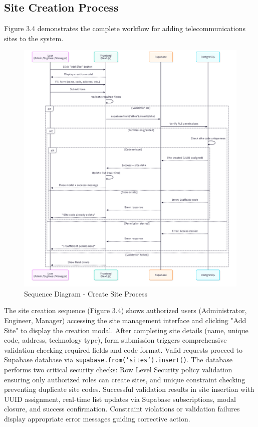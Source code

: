 \subsection{Site Creation Process}

Figure 3.4 demonstrates the complete workflow for adding telecommunications sites to the system.

\begin{figure}[H]
    \centering
    \includegraphics[width=0.95\linewidth]{img/chap_03/sequence_add_site.png}
    \caption{Sequence Diagram - Create Site Process}
    \label{fig:sequence_add_site}
\end{figure}

The site creation sequence (Figure 3.4) shows authorized users (Administrator, Engineer, Manager) accessing the site management interface and clicking "Add Site" to display the creation modal. After completing site details (name, unique code, address, technology type), form submission triggers comprehensive validation checking required fields and code format. Valid requests proceed to Supabase database via \texttt{supabase.from('sites').insert()}. The database performs two critical security checks: Row Level Security policy validation ensuring only authorized roles can create sites, and unique constraint checking preventing duplicate site codes. Successful validation results in site insertion with UUID assignment, real-time list updates via Supabase subscriptions, modal closure, and success confirmation. Constraint violations or validation failures display appropriate error messages guiding corrective action.

